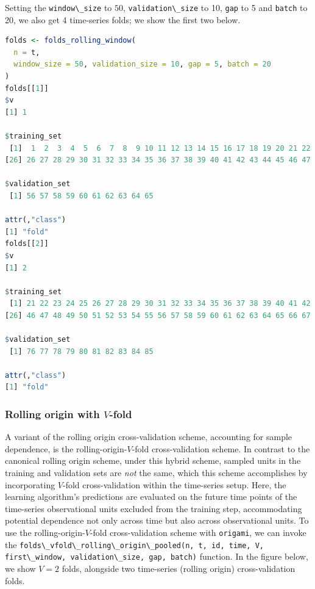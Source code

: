 \documentclass[
  12pt, krantz2,
]{krantz}
\newcommand{\passthrough}[1]{#1}
\newcommand{\1}{\mathbbm{1}}
\theoremstyle{definition}
\theoremstyle{definition}
\theoremstyle{definition}
\theoremstyle{definition}
\theoremstyle{remark}
\begin{document}
Setting the \passthrough{\lstinline!window\_size!} to \(50\), \passthrough{\lstinline!validation\_size!} to 10, \passthrough{\lstinline!gap!} to 5 and
\passthrough{\lstinline!batch!} to 20, we also get 4 time-series folds; we show the first two below.

\begin{lstlisting}[language=R]
folds <- folds_rolling_window(
  n = t,
  window_size = 50, validation_size = 10, gap = 5, batch = 20
)
folds[[1]]
$v
[1] 1

$training_set
 [1]  1  2  3  4  5  6  7  8  9 10 11 12 13 14 15 16 17 18 19 20 21 22 23 24 25
[26] 26 27 28 29 30 31 32 33 34 35 36 37 38 39 40 41 42 43 44 45 46 47 48 49 50

$validation_set
 [1] 56 57 58 59 60 61 62 63 64 65

attr(,"class")
[1] "fold"
folds[[2]]
$v
[1] 2

$training_set
 [1] 21 22 23 24 25 26 27 28 29 30 31 32 33 34 35 36 37 38 39 40 41 42 43 44 45
[26] 46 47 48 49 50 51 52 53 54 55 56 57 58 59 60 61 62 63 64 65 66 67 68 69 70

$validation_set
 [1] 76 77 78 79 80 81 82 83 84 85

attr(,"class")
[1] "fold"
\end{lstlisting}

\hypertarget{rolling-origin-with-v-fold}{%
\subsubsection{\texorpdfstring{Rolling origin with \(V\)-fold}{Rolling origin with V-fold}}\label{rolling-origin-with-v-fold}}

A variant of the rolling origin cross-validation scheme, accounting for sample
dependence, is the rolling-origin-\(V\)-fold cross-validation scheme. In contrast
to the canonical rolling origin scheme, under this hybrid scheme, sampled units
in the training and validation sets are \emph{not} the same, which this scheme
accomplishes by incorporating \(V\)-fold cross-validation within the time-series
setup. Here, the learning algorithm's predictions are evaluated on the future
time points of the time-series observational units excluded from the training
step, accommodating potential dependence not only across time but also across
observational units. To use the rolling-origin-\(V\)-fold cross-validation scheme
with \passthrough{\lstinline!origami!}, we can invoke the \passthrough{\lstinline!folds\_vfold\_rolling\_origin\_pooled(n, t, id, time, V, first\_window, validation\_size, gap, batch)!} function. In the figure
below, we show \(V=2\) folds, alongside two time-series (rolling origin)
cross-validation folds.
\end{document}
